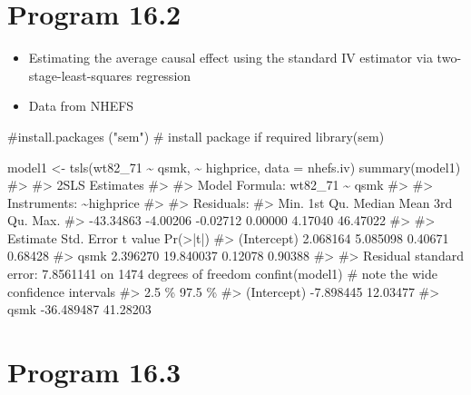 \documentclass[
  10pt,
  a4paper,
]{book}
\newenvironment{Shaded}{\begin{snugshade}}{\end{snugshade}}
\newcommand{\AttributeTok}[1]{\textcolor[rgb]{0.40,0.45,0.13}{#1}}
\newcommand{\CommentTok}[1]{\textcolor[rgb]{0.37,0.37,0.37}{#1}}
\newcommand{\FunctionTok}[1]{\textcolor[rgb]{0.28,0.35,0.67}{#1}}
\newcommand{\NormalTok}[1]{\textcolor[rgb]{0.00,0.46,0.62}{#1}}
\newcommand{\OtherTok}[1]{\textcolor[rgb]{0.00,0.46,0.62}{#1}}
\newcommand{\SpecialCharTok}[1]{\textcolor[rgb]{0.37,0.37,0.37}{#1}}
\providecommand{\tightlist}{%
  \setlength{\itemsep}{0pt}\setlength{\parskip}{0pt}}
\begin{document}
\section{Program 16.2}\label{program-16.2}

\begin{itemize}
\tightlist
\item
  Estimating the average causal effect using the standard IV estimator via two-stage-least-squares regression
\item
  Data from NHEFS
\end{itemize}

\begin{Shaded}
\begin{Highlighting}[]
\CommentTok{\#install.packages ("sem") \# install package if required}
\FunctionTok{library}\NormalTok{(sem)}

\NormalTok{model1 }\OtherTok{\textless{}{-}} \FunctionTok{tsls}\NormalTok{(wt82\_71 }\SpecialCharTok{\textasciitilde{}}\NormalTok{ qsmk, }\SpecialCharTok{\textasciitilde{}}\NormalTok{ highprice, }\AttributeTok{data =}\NormalTok{ nhefs.iv)}
\FunctionTok{summary}\NormalTok{(model1)}
\CommentTok{\#\textgreater{} }
\CommentTok{\#\textgreater{}  2SLS Estimates}
\CommentTok{\#\textgreater{} }
\CommentTok{\#\textgreater{} Model Formula: wt82\_71 \textasciitilde{} qsmk}
\CommentTok{\#\textgreater{} }
\CommentTok{\#\textgreater{} Instruments: \textasciitilde{}highprice}
\CommentTok{\#\textgreater{} }
\CommentTok{\#\textgreater{} Residuals:}
\CommentTok{\#\textgreater{}      Min.   1st Qu.    Median      Mean   3rd Qu.      Max. }
\CommentTok{\#\textgreater{} {-}43.34863  {-}4.00206  {-}0.02712   0.00000   4.17040  46.47022 }
\CommentTok{\#\textgreater{} }
\CommentTok{\#\textgreater{}              Estimate Std. Error t value Pr(\textgreater{}|t|)}
\CommentTok{\#\textgreater{} (Intercept)  2.068164   5.085098 0.40671  0.68428}
\CommentTok{\#\textgreater{} qsmk         2.396270  19.840037 0.12078  0.90388}
\CommentTok{\#\textgreater{} }
\CommentTok{\#\textgreater{} Residual standard error: 7.8561141 on 1474 degrees of freedom}
\FunctionTok{confint}\NormalTok{(model1)  }\CommentTok{\# note the wide confidence intervals}
\CommentTok{\#\textgreater{}                  2.5 \%   97.5 \%}
\CommentTok{\#\textgreater{} (Intercept)  {-}7.898445 12.03477}
\CommentTok{\#\textgreater{} qsmk        {-}36.489487 41.28203}
\end{Highlighting}
\end{Shaded}

\section{Program 16.3}\label{program-16.3}
\end{document}
